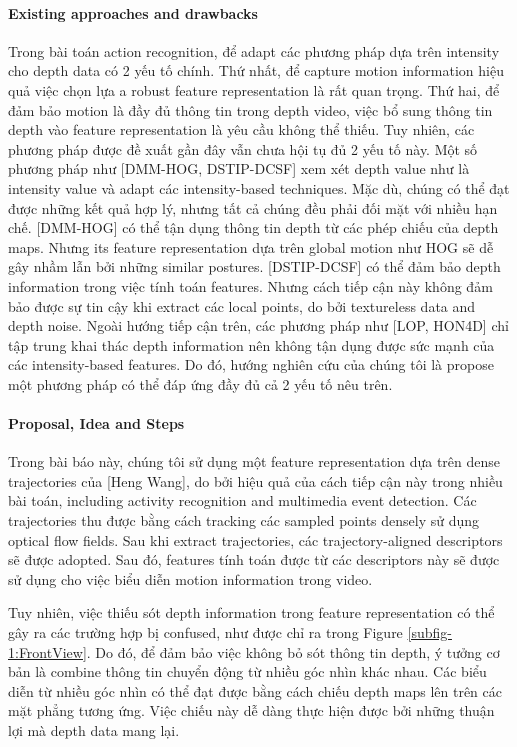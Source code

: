 \documentclass[review]{elsarticle}
\begin{document}
\paragraph{Existing approaches and drawbacks} Trong bài toán action recognition, để adapt các phương pháp dựa trên intensity cho depth data có 2 yếu tố chính. Thứ nhất, để capture motion information hiệu quả việc chọn lựa a robust feature representation là rất quan trọng. Thứ hai, để đảm bảo motion là đầy đủ thông tin trong depth video, việc bổ sung thông tin depth vào feature representation là yêu cầu không thể thiếu. Tuy nhiên, các phương pháp được đề xuất gần đây vẫn chưa hội tụ đủ 2 yếu tố này. Một số phương pháp như [DMM-HOG, DSTIP-DCSF] xem xét depth value như là intensity value và adapt các intensity-based techniques. Mặc dù, chúng có thể đạt được những kết quả hợp lý, nhưng tất cả chúng đều phải đối mặt với nhiều hạn chế. [DMM-HOG] có thể tận dụng thông tin depth từ các phép chiếu của depth maps. Nhưng its feature representation dựa trên global motion như HOG sẽ dễ gây nhầm lẫn bởi những similar postures. [DSTIP-DCSF] có thể đảm bảo depth information trong việc tính toán features. Nhưng cách tiếp cận này không đảm bảo được sự tin cậy khi extract các local points, do bởi textureless data and depth noise. Ngoài hướng tiếp cận trên, các phương pháp như [LOP, HON4D] chỉ tập trung khai thác depth information nên không tận dụng được sức mạnh của các intensity-based features. Do đó, hướng nghiên cứu của chúng tôi là propose một phương pháp có thể đáp ứng đầy đủ cả 2 yếu tố nêu trên.

\paragraph{Proposal, Idea and Steps}Trong bài báo này, chúng tôi sử dụng một feature representation dựa trên dense trajectories của [Heng Wang], do bởi hiệu quả của cách tiếp cận này trong nhiều bài toán, including activity recognition and multimedia event detection. Các trajectories thu được bằng cách tracking các sampled points densely sử dụng optical flow fields. Sau khi extract trajectories, các trajectory-aligned descriptors sẽ được adopted. Sau đó, features tính toán được từ các descriptors này sẽ được sử dụng cho việc biểu diễn motion information trong video.

Tuy nhiên, việc thiếu sót depth information trong feature representation có thể gây ra các trường hợp bị confused, như được chỉ ra trong Figure \ref{subfig-1:FrontView}. Do đó, để đảm bảo việc không bỏ sót thông tin depth, ý tưởng cơ bản là combine thông tin chuyển động từ nhiều góc nhìn khác nhau. Các biểu diễn từ nhiều góc nhìn có thể đạt được bằng cách chiếu depth maps lên trên các mặt phẳng tương ứng. Việc chiếu này dễ dàng thực hiện được bởi những thuận lợi mà depth data mang lại.
\end{document}
